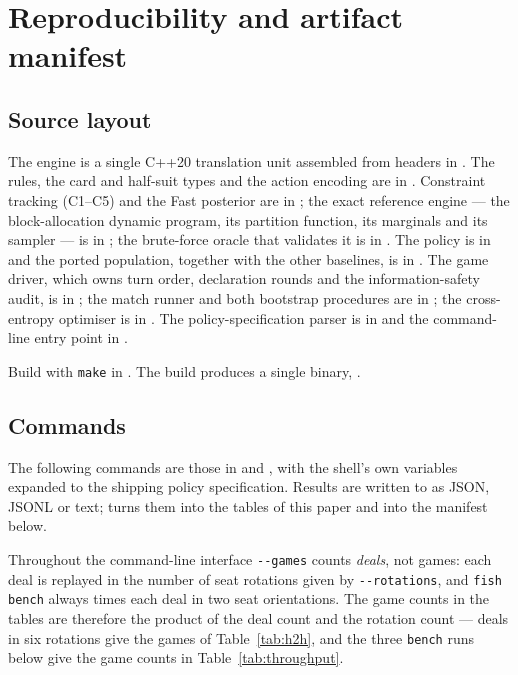 \section{Reproducibility and artifact manifest}
\label{app:repro}

\subsection{Source layout}
\label{app:repro-source}

The engine is a single C++20 translation unit assembled from headers in
. The rules, the card and half-suit types and the action
encoding are in . Constraint tracking (C1--C5) and the
Fast posterior are in ; the exact reference engine
--- the block-allocation dynamic program, its partition function, its marginals
and its sampler --- is in ; the brute-force oracle
that validates it is in . The policy is in
 and the ported \vthree{} population, together with the
other baselines, is in . The game driver, which
owns turn order, declaration rounds and the information-safety audit, is in
; the match runner and both bootstrap procedures are
in ; the cross-entropy optimiser is in
. The policy-specification parser is in
 and the command-line entry point in
.

Build with \verb|make| in . The build produces a single binary,
.

\subsection{Commands}
\label{app:repro-commands}

The following commands are those in  and
, with the shell's own variables expanded to the
shipping policy specification. Results are written to
 as JSON, JSONL or text;
 turns them into the tables of this paper and
 into the manifest below.

Throughout the command-line interface \texttt{-{}-games} counts \emph{deals},
not games: each deal is replayed in the number of seat rotations given by
\texttt{-{}-rotations}, and \texttt{fish bench} always times each deal in two
seat orientations. The game counts in the tables are therefore the product of
the deal count and the rotation count --- \numHtHDeals{} deals in six rotations
give the \numHtHGames{} games of Table~\ref{tab:h2h}, and the three
\texttt{bench} runs below give the game counts in Table~\ref{tab:throughput}.

